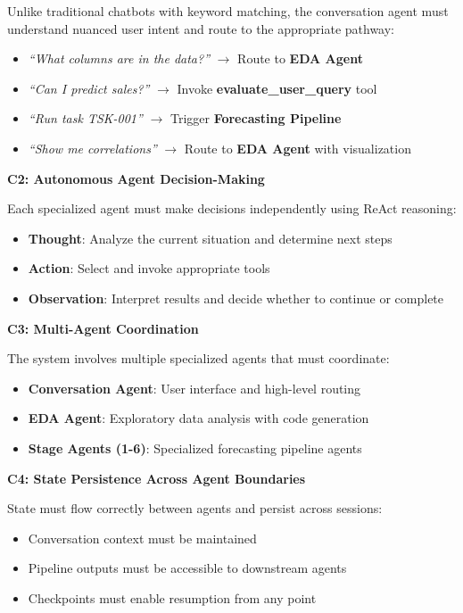 \documentclass[11pt,a4paper]{article}
\begin{document}
Unlike traditional chatbots with keyword matching, the conversation agent must understand nuanced user intent and route to the appropriate pathway:
\begin{itemize}
    \item \textit{``What columns are in the data?''} $\rightarrow$ Route to \textbf{EDA Agent}
    \item \textit{``Can I predict sales?''} $\rightarrow$ Invoke \textbf{evaluate\_user\_query} tool
    \item \textit{``Run task TSK-001''} $\rightarrow$ Trigger \textbf{Forecasting Pipeline}
    \item \textit{``Show me correlations''} $\rightarrow$ Route to \textbf{EDA Agent} with visualization
\end{itemize}

\textbf{C2: Autonomous Agent Decision-Making}

Each specialized agent must make decisions independently using ReAct reasoning:
\begin{itemize}
    \item \textbf{Thought}: Analyze the current situation and determine next steps
    \item \textbf{Action}: Select and invoke appropriate tools
    \item \textbf{Observation}: Interpret results and decide whether to continue or complete
\end{itemize}

\textbf{C3: Multi-Agent Coordination}

The system involves multiple specialized agents that must coordinate:
\begin{itemize}
    \item \textbf{Conversation Agent}: User interface and high-level routing
    \item \textbf{EDA Agent}: Exploratory data analysis with code generation
    \item \textbf{Stage Agents (1-6)}: Specialized forecasting pipeline agents
\end{itemize}

\textbf{C4: State Persistence Across Agent Boundaries}

State must flow correctly between agents and persist across sessions:
\begin{itemize}
    \item Conversation context must be maintained
    \item Pipeline outputs must be accessible to downstream agents
    \item Checkpoints must enable resumption from any point
\end{itemize}
\end{document}
